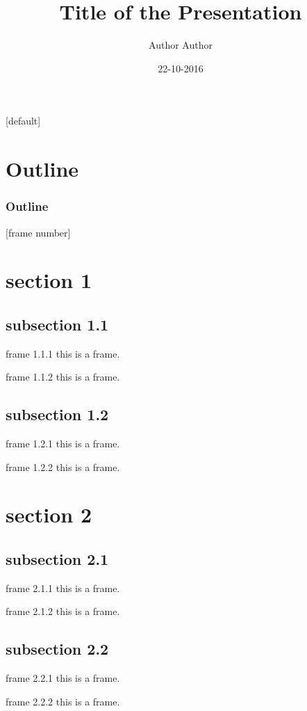 \documentclass{beamer}
\title{Title of the Presentation}
\author{Author Author}
\date{22-10-2016}
\begin{document}
[default]
\begin{frame}[noframenumbering]
\titlepage
\end{frame}
\section*{Outline}
\begin{frame}[noframenumbering]
\frametitle{Outline}
\tableofcontents[hideallsubsections]
\end{frame}
[frame number]
\section{section 1}
\subsection{subsection 1.1}
\begin{frame}{frame 1.1.1}
this is a frame.
\end{frame}
\begin{frame}{frame 1.1.2}
this is a frame.
\end{frame}
\subsection{subsection 1.2}
\begin{frame}{frame 1.2.1}
this is a frame.
\end{frame}
\begin{frame}{frame 1.2.2}
this is a frame.
\end{frame}
\section{section 2}
\subsection{subsection 2.1}
\begin{frame}{frame 2.1.1}
this is a frame.
\end{frame}
\begin{frame}{frame 2.1.2}
this is a frame.
\end{frame}
\subsection{subsection 2.2}
\begin{frame}{frame 2.2.1}
this is a frame.
\end{frame}
\begin{frame}{frame 2.2.2}
this is a frame.
\end{frame}
\end{document}

